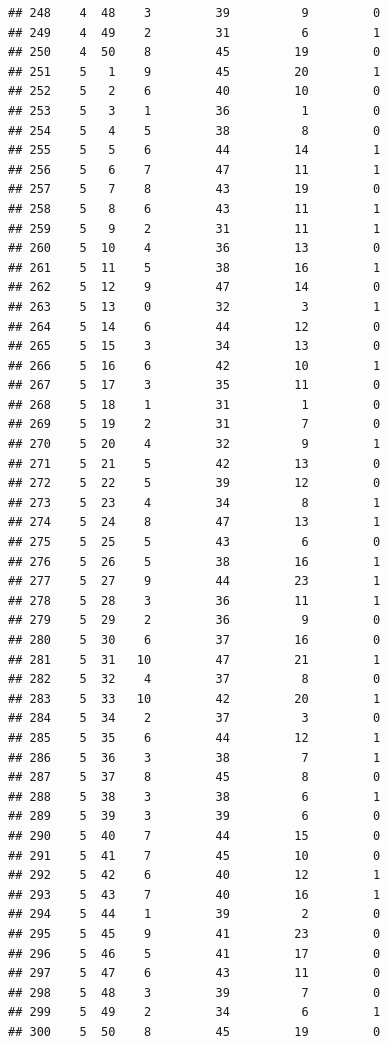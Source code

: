 \documentclass[]{book}
\begin{document}
\begin{verbatim}
## 248    4  48    3         39          9         0
## 249    4  49    2         31          6         1
## 250    4  50    8         45         19         0
## 251    5   1    9         45         20         1
## 252    5   2    6         40         10         0
## 253    5   3    1         36          1         0
## 254    5   4    5         38          8         0
## 255    5   5    6         44         14         1
## 256    5   6    7         47         11         1
## 257    5   7    8         43         19         0
## 258    5   8    6         43         11         1
## 259    5   9    2         31         11         1
## 260    5  10    4         36         13         0
## 261    5  11    5         38         16         1
## 262    5  12    9         47         14         0
## 263    5  13    0         32          3         1
## 264    5  14    6         44         12         0
## 265    5  15    3         34         13         0
## 266    5  16    6         42         10         1
## 267    5  17    3         35         11         0
## 268    5  18    1         31          1         0
## 269    5  19    2         31          7         0
## 270    5  20    4         32          9         1
## 271    5  21    5         42         13         0
## 272    5  22    5         39         12         0
## 273    5  23    4         34          8         1
## 274    5  24    8         47         13         1
## 275    5  25    5         43          6         0
## 276    5  26    5         38         16         1
## 277    5  27    9         44         23         1
## 278    5  28    3         36         11         1
## 279    5  29    2         36          9         0
## 280    5  30    6         37         16         0
## 281    5  31   10         47         21         1
## 282    5  32    4         37          8         0
## 283    5  33   10         42         20         1
## 284    5  34    2         37          3         0
## 285    5  35    6         44         12         1
## 286    5  36    3         38          7         1
## 287    5  37    8         45          8         0
## 288    5  38    3         38          6         1
## 289    5  39    3         39          6         0
## 290    5  40    7         44         15         0
## 291    5  41    7         45         10         0
## 292    5  42    6         40         12         1
## 293    5  43    7         40         16         1
## 294    5  44    1         39          2         0
## 295    5  45    9         41         23         0
## 296    5  46    5         41         17         0
## 297    5  47    6         43         11         0
## 298    5  48    3         39          7         0
## 299    5  49    2         34          6         1
## 300    5  50    8         45         19         0
\end{verbatim}
\end{document}
